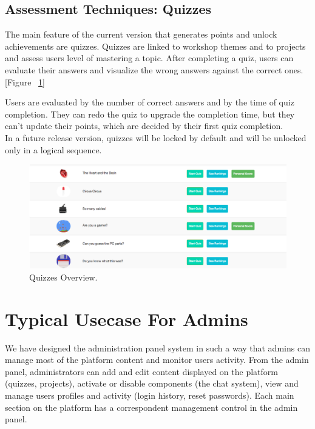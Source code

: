 \subsection{Assessment Techniques: Quizzes}

The main feature of the current version that generates points and unlock achievements are quizzes. Quizzes are linked to workshop themes and to projects and assess users level of mastering a topic.
After completing a quiz, users can evaluate their answers and visualize the wrong answers against the correct ones. [Figure ~\ref{fig:Quizzes}]

Users are evaluated by the number of correct answers and by the time of quiz completion. They can redo the quiz to upgrade the completion time, but they can't update their points, which are decided by their first quiz completion. \\

In a future release version, quizzes will be locked by default and will be unlocked only in a logical sequence. 

\begin{figure}
\includegraphics[width=1\linewidth]{images/ui/Quizzes.png}
\caption{Quizzes Overview.}
\label{fig:Quizzes}
\end{figure}

\section{Typical Usecase For Admins}

We have designed the administration panel system in such a way that admins can manage most of the platform content and monitor users activity. From the admin panel, administrators can add and edit content displayed on the platform (quizzes, projects), activate or disable components (the chat system), view and manage users profiles and activity (login history, reset passwords). Each main section on the platform has a correspondent management control in the admin panel. \\



